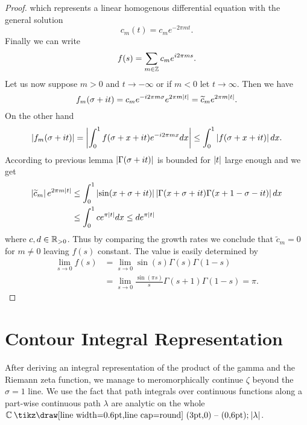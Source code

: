 \begin{proof}
	which represents a linear homogenous differential equation with the general solution
\begin{equation*}
	c_m(t) = c_m e^{-2 \pi m t}.
\end{equation*}
	Finally we can write
\begin{equation*}
	f(s) = \sum _{m \in \mathbb{Z}} c_m e^{i 2 \pi m s}.
\end{equation*}
	Let us now suppose $m > 0$ and $t \to -\infty$ or if $m < 0$ let $t \to \infty$. Then we have
\begin{equation*}
	f_m(\sigma + i t) = c_m e^{-i 2 \pi m \sigma} e^{2 \pi m \left|t\right|} = \widetilde{c}_m e^{2 \pi m \left|t\right|}.
\end{equation*}
	On the other hand
\begin{equation*}
	\left|f_m(\sigma + i t)\right| = \left|\int _0 ^1 f(\sigma + x + i t) e^{- i 2 \pi m x} dx\right| \leq \int _0 ^1 \left|f(\sigma + x + i t)\right| dx.
\end{equation*}
	According to previous lemma  $\left|\Gamma(\sigma + i t)\right|$ is bounded for $\left|t\right|$ large enough and we get
\begin{equation*}
\begin{aligned}
	\left|\widetilde{c}_m\right| e^{2 \pi m \left|t\right|}
	&\leq \int_0^1 \left|\sin(x + \sigma + i t)\right| \left|\Gamma(x + \sigma + i t) \Gamma(x + 1 - \sigma - i t)\right| dx \\
	&\leq \int_0^1 c e^{\pi \left|t\right|} dx
	\leq d e^{\pi \left|t\right|}
\end{aligned}
\end{equation*}
	where $c,d \in \mathbb{R}_{> 0}$. Thus by comparing the growth rates we conclude that $\widetilde{c}_m = 0$ for $m \neq 0$ leaving $f(s)$ constant. The value is easily determined by
\begin{equation*}
\begin{aligned}
	\lim\limits_{s \to 0} f(s)
	&= \lim\limits_{s \to 0} \sin(s) \Gamma(s) \Gamma(1 - s) \\
	&= \lim\limits_{s \to 0} \frac{\sin(\pi s)}{s} \Gamma(s + 1) \Gamma(1 - s)
	= \pi.
\end{aligned}	
\end{equation*}

\end{proof}


\section{Contour Integral Representation}
After deriving an integral representation of the product of the gamma and the Riemann zeta function, we manage to meromorphically continue $\zeta$ beyond the $\sigma = 1$ line. We use the fact that path integrals over continuous functions along a part-wise continuous path $\lambda$ are analytic on the whole $\field{C} \mysetminus \abs{\lambda}$.


